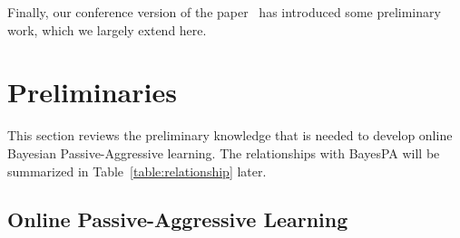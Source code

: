 \documentclass[twoside,11pt]{article}
\newcommand{\junx}[1]{{\color{red}{\bf\sf #1}}}
\begin{document}
Finally, our conference version of the paper~\citep{shi2014bayespa} has introduced some preliminary work, which we largely extend here.


\section{Preliminaries}\label{sec:pre}

This section reviews the preliminary knowledge that is needed to develop online Bayesian Passive-Aggressive learning. The relationships with BayesPA will be summarized in Table~\ref{table:relationship} later.

\subsection{Online Passive-Aggressive Learning}\label{sec:pa}
\end{document}
